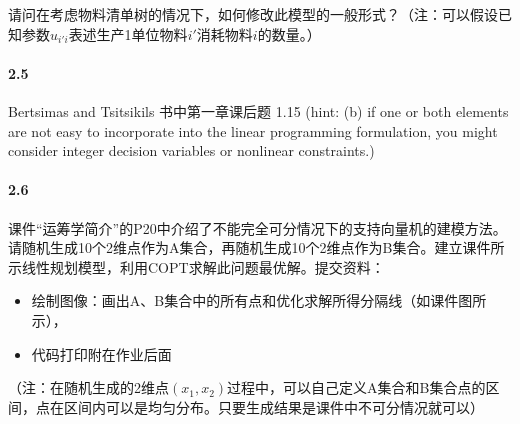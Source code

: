 \documentclass[12pt,a4paper]{article}
\begin{document}
请问在考虑物料清单树的情况下，如何修改此模型的一般形式？（注：可以假设已知参数$u_{i'i}$表述生产1单位物料$i'$消耗物料$i$的数量。）

\paragraph{2.5}
Bertsimas and Tsitsikils 书中第一章课后题 1.15 
(hint: (b) if one or both elements are not easy to incorporate into the linear programming formulation, you might consider integer decision variables or nonlinear constraints.)


\paragraph{2.6}
课件“运筹学简介”的P20中介绍了不能完全可分情况下的支持向量机的建模方法。请随机生成10个2维点作为A集合，再随机生成10个2维点作为B集合。建立课件所示线性规划模型，利用COPT求解此问题最优解。提交资料：

\begin{itemize}
	\item 绘制图像：画出A、B集合中的所有点和优化求解所得分隔线（如课件图所示），
	
	\item 代码打印附在作业后面
\end{itemize}


（注：在随机生成的2维点$(x_1,x_2)$过程中，可以自己定义A集合和B集合点的区间，点在区间内可以是均匀分布。只要生成结果是课件中不可分情况就可以）
\end{document}
